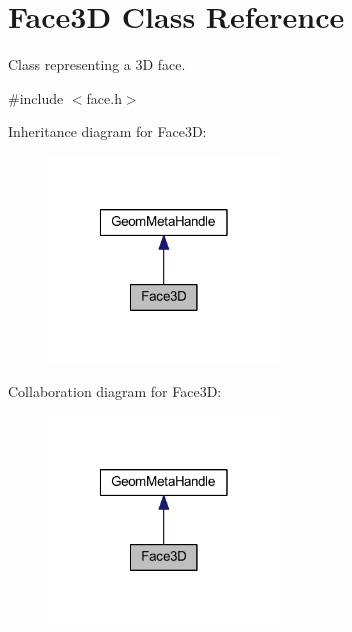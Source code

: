 \hypertarget{class_face3_d}{\section{Face3\-D Class Reference}
\label{class_face3_d}
}


Class representing a 3\-D face.  




{\ttfamily \#include $<$face.\-h$>$}



Inheritance diagram for Face3\-D\-:
\nopagebreak
\begin{figure}[H]
\begin{center}
\leavevmode
\includegraphics[width=174pt]{class_face3_d__inherit__graph}
\end{center}
\end{figure}


Collaboration diagram for Face3\-D\-:
\nopagebreak
\begin{figure}[H]
\begin{center}
\leavevmode
\includegraphics[width=174pt]{class_face3_d__coll__graph}
\end{center}
\end{figure}
